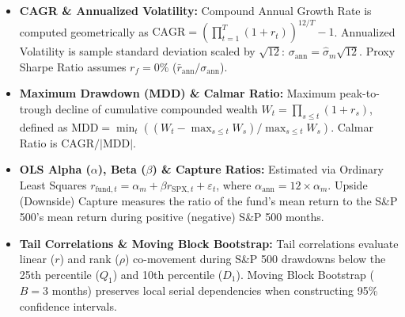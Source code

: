 \documentclass[10pt,a4paper]{article}
\begin{document}
\begin{tcolorbox}[colback=cardbg, colframe=cardborder, title=\textbf{\small\strut Appendix B: Quantitative Framework \& Indicator Definitions}, fonttitle=\sffamily\bfseries\small\color{primary}, arc=5pt, boxrule=0.8pt, toptitle=4pt, bottomtitle=4pt, left=6pt, right=6pt, top=4pt, bottom=4pt, colbacktitle=cardborder]
\scriptsize
\begin{itemize}[leftmargin=1.2em, itemsep=1.5pt, topsep=1pt]
    \item \textbf{CAGR \& Annualized Volatility:} Compound Annual Growth Rate is computed geometrically as $\text{CAGR} = \left(\prod_{t=1}^T (1 + r_t)\right)^{12/T} - 1$. Annualized Volatility is sample standard deviation scaled by $\sqrt{12}$: $\sigma_{\text{ann}} = \hat{\sigma}_m \sqrt{12}$. Proxy Sharpe Ratio assumes $r_f = 0\%$ ($\bar{r}_{\text{ann}} / \sigma_{\text{ann}}$).
    \item \textbf{Maximum Drawdown (MDD) \& Calmar Ratio:} Maximum peak-to-trough decline of cumulative compounded wealth $W_t = \prod_{s \le t}(1+r_s)$, defined as $\text{MDD} = \min_t \left((W_t - \max_{s \le t} W_s) / \max_{s \le t} W_s\right)$. Calmar Ratio is $\text{CAGR} / |\text{MDD}|$.
    \item \textbf{OLS Alpha ($\alpha$), Beta ($\beta$) \& Capture Ratios:} Estimated via Ordinary Least Squares $r_{\text{fund},t} = \alpha_m + \beta r_{\text{SPX},t} + \varepsilon_t$, where $\alpha_{\text{ann}} = 12 \times \alpha_m$. Upside (Downside) Capture measures the ratio of the fund's mean return to the S\&P 500's mean return during positive (negative) S\&P 500 months.
    \item \textbf{Tail Correlations \& Moving Block Bootstrap:} Tail correlations evaluate linear ($r$) and rank ($\rho$) co-movement during S\&P 500 drawdowns below the 25th percentile ($Q_1$) and 10th percentile ($D_1$). Moving Block Bootstrap ($B=3$ months) preserves local serial dependencies when constructing 95\% confidence intervals.
\end{itemize}
\end{tcolorbox}

\vspace{0.35em}
\end{document}
